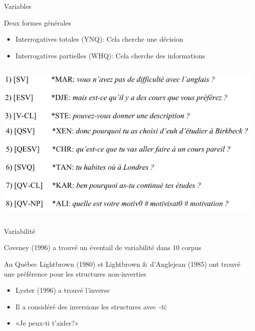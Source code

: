 \documentclass{beamer}
\begin{document}
    \begin{frame}{Variables}
      \begin{block}{Deux formes générales}
        \begin{itemize}
          \item Interrogatives totales (YNQ): Cela cherche une décision
          \item Interrogatives partielles (WHQ): Cela cherche des informations
        \end{itemize}
      \end{block}
      \begin{columns}
          \includegraphics[scale=0.35]{interrogatives_totales.jpg}
          \includegraphics[scale=0.35]{interrogatives_partielles.jpg}
      \end{columns}
    \end{frame}

    \begin{frame}{Variabilité}
      \begin{block}{}
        Coveney (1996) a trouvé un éventail de variabilité dans 10 corpus
      \end{block}
      \begin{block}{Au Québec}
        Lightbrown (1980) et Lightbrown \& d'Anglejean (1985) ont trouvé une préférence pour les structures non-inverties
        \begin{itemize}
          \item Lyster (1996) a trouvé l'inverse
          \item Il a considéré des inversions les structures avec \emph{-ti}:
          \item «Je peux-ti t'aider?»
        \end{itemize}
      \end{block}
    \end{frame}
\end{document}
